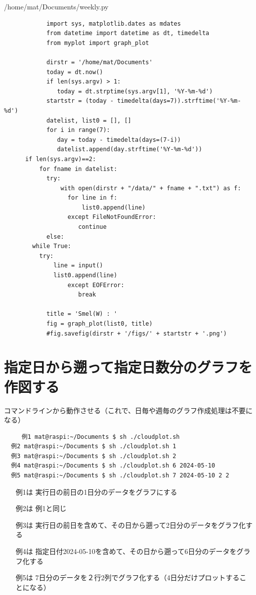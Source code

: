 \documentclass[12pt,a4j]{jsbook}
\begin{document}
\begin{spacing}{0.8}
\begin{itembox}[l]{/home/mat/Documents/weekly.py}
\begin{verbatim}
			import sys, matplotlib.dates as mdates
			from datetime import datetime as dt, timedelta
			from myplot import graph_plot

			dirstr = '/home/mat/Documents'
			today = dt.now()
			if len(sys.argv) > 1:
			   today = dt.strptime(sys.argv[1], '%Y-%m-%d')
			startstr = (today - timedelta(days=7)).strftime('%Y-%m-%d')
			datelist, list0 = [], []
			for i in range(7):
			   day = today - timedelta(days=(7-i))
			   datelist.append(day.strftime('%Y-%m-%d'))
      if len(sys.argv)==2:
          for fname in datelist:
            try:
                with open(dirstr + "/data/" + fname + ".txt") as f:
                  for line in f:
                      list0.append(line)
			      except FileNotFoundError:
			         continue
			else:
        while True:
          try:
              line = input()
              list0.append(line)
			      except EOFError:
			         break

			title = 'Smel(W) : '
			fig = graph_plot(list0, title)
			#fig.savefig(dirstr + '/figs/' + startstr + '.png')
\end{verbatim}
\end{itembox}
\end{spacing}

\newpage

\section{指定日から遡って指定日数分のグラフを作図する}

コマンドラインから動作させる（これで、日毎や週毎のグラフ作成処理は不要になる）

\begin{spacing}{0.95}
\begin{screen}
\begin{verbatim}
	 例1 mat@raspi:~/Documents $ sh ./cloudplot.sh
  例2 mat@raspi:~/Documents $ sh ./cloudplot.sh 1
  例3 mat@raspi:~/Documents $ sh ./cloudplot.sh 2
  例4 mat@raspi:~/Documents $ sh ./cloudplot.sh 6 2024-05-10
  例5 mat@raspi:~/Documents $ sh ./cloudplot.sh 7 2024-05-10 2 2
\end{verbatim}
\end{screen}
\end{spacing}

\begin{itemize}
\item[例1は] 実行日の前日の1日分のデータをグラフにする
\item[例2は] 例1と同じ
\item[例3は] 実行日の前日を含めて、その日から遡って2日分のデータをグラフ化する
\item[例4は] 指定日付2024-05-10を含めて、その日から遡って6日分のデータをグラフ化する
\item[例5は] 7日分のデータを２行2列でグラフ化する（4日分だけプロットすることになる）
\end{itemize}
\end{document}
